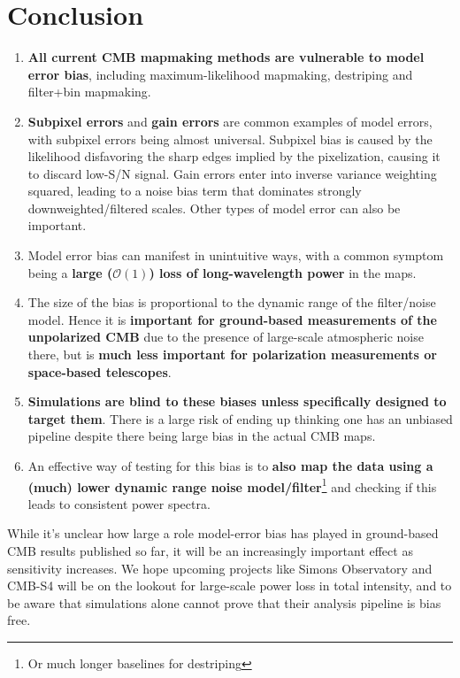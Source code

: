 \documentclass[twocolumn,apj]{aastex63}
\begin{document}
\section{Conclusion}

\begin{enumerate}
	\item \textbf{All current CMB mapmaking methods are vulnerable to model error bias},
		including maximum-likelihood mapmaking, destriping and filter+bin mapmaking.
	\item \textbf{Subpixel errors} and \textbf{gain errors} are common examples of
		model errors, with subpixel errors being almost universal.
		Subpixel bias is caused by the likelihood disfavoring the sharp edges implied by
		the pixelization, causing it to discard low-S/N signal. Gain errors enter into inverse
		variance weighting squared, leading to a noise bias term that dominates strongly downweighted/filtered scales.
		Other types of model error can also be important.
	\item Model error bias can manifest in unintuitive ways, with a common symptom
		being a \textbf{large ($\mathcal{O}(1)$) loss of long-wavelength power} in the maps.
	\item The size of the bias is proportional to the dynamic range of the filter/noise model.
		Hence it is \textbf{important for ground-based measurements of the unpolarized CMB}
		due to the presence of large-scale atmospheric noise there, but is \textbf{much less
		important for polarization measurements or space-based telescopes}.
	\item \textbf{Simulations are blind to these biases unless specifically designed to
		target them}. There is a large risk of ending up thinking one has an unbiased
		pipeline despite there being large bias in the actual CMB maps.
	\item An effective way of testing for this bias is to \textbf{also map the data using a
		(much) lower dynamic range noise model/filter}\footnote{Or much longer baselines for destriping}
		and checking if this leads to consistent power spectra.
\end{enumerate}

While it's unclear how large a role model-error bias has played in ground-based CMB results published
so far, it will be an increasingly important effect as sensitivity increases. We hope upcoming
projects like Simons Observatory and CMB-S4 will be on the lookout for large-scale power loss in
total intensity, and to be aware that simulations alone cannot prove that their analysis pipeline
is bias free.
\end{document}
